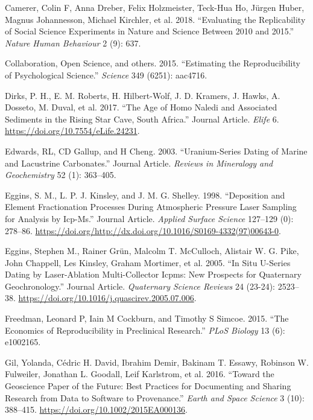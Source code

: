 \documentclass[]{elsarticle} %
\begin{document}
\leavevmode\hypertarget{ref-camerer2018evaluating}{}%
Camerer, Colin F, Anna Dreber, Felix Holzmeister, Teck-Hua Ho, Jürgen Huber, Magnus Johannesson, Michael Kirchler, et al. 2018. ``Evaluating the Replicability of Social Science Experiments in Nature and Science Between 2010 and 2015.'' \emph{Nature Human Behaviour} 2 (9): 637.

\leavevmode\hypertarget{ref-open2015estimating}{}%
Collaboration, Open Science, and others. 2015. ``Estimating the Reproducibility of Psychological Science.'' \emph{Science} 349 (6251): aac4716.

\leavevmode\hypertarget{ref-Dirks2017}{}%
Dirks, P. H., E. M. Roberts, H. Hilbert-Wolf, J. D. Kramers, J. Hawks, A. Dosseto, M. Duval, et al. 2017. ``The Age of Homo Naledi and Associated Sediments in the Rising Star Cave, South Africa.'' Journal Article. \emph{Elife} 6. \url{https://doi.org/10.7554/eLife.24231}.

\leavevmode\hypertarget{ref-RN4495}{}%
Edwards, RL, CD Gallup, and H Cheng. 2003. ``Uranium-Series Dating of Marine and Lacustrine Carbonates.'' Journal Article. \emph{Reviews in Mineralogy and Geochemistry} 52 (1): 363--405.

\leavevmode\hypertarget{ref-RN2257}{}%
Eggins, S. M., L. P. J. Kinsley, and J. M. G. Shelley. 1998. ``Deposition and Element Fractionation Processes During Atmospheric Pressure Laser Sampling for Analysis by Icp-Ms.'' Journal Article. \emph{Applied Surface Science} 127--129 (0): 278--86. \url{https://doi.org/http://dx.doi.org/10.1016/S0169-4332(97)00643-0}.

\leavevmode\hypertarget{ref-Eggins2005}{}%
Eggins, Stephen M., Rainer Grün, Malcolm T. McCulloch, Alistair W. G. Pike, John Chappell, Les Kinsley, Graham Mortimer, et al. 2005. ``In Situ U-Series Dating by Laser-Ablation Multi-Collector Icpms: New Prospects for Quaternary Geochronology.'' Journal Article. \emph{Quaternary Science Reviews} 24 (23-24): 2523--38. \url{https://doi.org/10.1016/j.quascirev.2005.07.006}.

\leavevmode\hypertarget{ref-freedman2015economics}{}%
Freedman, Leonard P, Iain M Cockburn, and Timothy S Simcoe. 2015. ``The Economics of Reproducibility in Preclinical Research.'' \emph{PLoS Biology} 13 (6): e1002165.

\leavevmode\hypertarget{ref-Gil_et_al_2016}{}%
Gil, Yolanda, Cédric H. David, Ibrahim Demir, Bakinam T. Essawy, Robinson W. Fulweiler, Jonathan L. Goodall, Leif Karlstrom, et al. 2016. ``Toward the Geoscience Paper of the Future: Best Practices for Documenting and Sharing Research from Data to Software to Provenance.'' \emph{Earth and Space Science} 3 (10): 388--415. \url{https://doi.org/10.1002/2015EA000136}.
\end{document}
